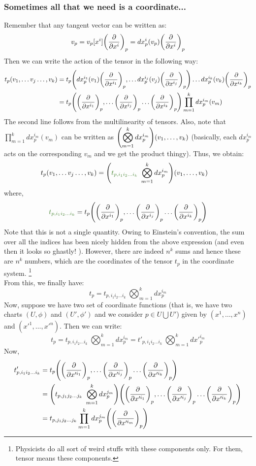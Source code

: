 \subsubsection{Sometimes all that we need is a coordinate...}
Remember that any tangent vector can be written as:
$$v_p = v_p[x^i]\qty(\pdv{x^i})_p = dx_p^i(v_p)\qty(\pdv{x^i})_p$$
Then we can write the action of the tensor in the following way:
\begin{align*}
    t_p\qty(v_1,\ldots v_j \ldots ,v_k) &= t_p\qty( dx^{i_1}_p(v_1)\qty(\pdv{x^{i_1}})_p, \ldots dx^{i_j}_p(v_j)\qty(\pdv{x^{i_j}})_p)\ldots dx^{i_k}_p(v_k)\qty(\pdv{x^{i_k}})_p\\
    &=t_p\qty(\qty(\pdv{x^{i_1}})_p, \ldots \qty(\pdv{x^{i_j}})_p \ldots \qty(\pdv{x^{i_k}})_p) \prod\limits_{m=1}^k dx^{i_m}_p(v_m)
\end{align*}
The second line follows from the multilinearity of tensors. Also, note that $\prod\limits_{m=1}^k dx^{i_m}_p(v_m)$ can be written as $ \displaystyle \qty(\bigotimes_{m=1}^k dx^{i_m}_p)(v_1,\ldots,v_k)$ (basically, each $dx^{i_m}_p$ acts on the corresponding $v_m$ and we get the product thingy). Thus, we obtain:
\begin{align*}
    t_p\qty(v_1,\ldots v_j \ldots ,v_k) &= \qty(\mathcolor{OliveGreen}{t_{p,i_1i_2\ldots i_k}}\ \bigotimes_{m=1}^k dx^{i_m}_p)(v_1,\ldots,v_k)
\end{align*}
where, $$\mathcolor{OliveGreen}{t_{p,i_1i_2\ldots i_k}} = t_p\qty(\qty(\pdv{x^{i_1}})_p, \ldots \qty(\pdv{x^{i_j}})_p \ldots \qty(\pdv{x^{i_k}})_p)$$ Note that this is not a single quantity. Owing to Einstein's convention, the sum over all the indices has been nicely hidden from the above expression (and even then it looks so ghastly! ). However, there are indeed $n^k$ sums and hence these are $n^k$ numbers, which are the coordinates of the tensor $t_p$ in the coordinate system. \footnote{Physicists do all sort of weird stuffs with these components only. For them, tensor means these components.}\\[0.2cm]
From this, we finally have:
$$t_p = t_{p,i_1i_2\ldots i_k} \ \bigotimes_{m=1}^k dx^{i_m}_p$$
Now, suppose we have two set of coordinate functions (that is, we have two charts $(U,\phi)$ and $(U',\phi')$ and we consider $p\in U\bigcup U'$) given by $(x^1,\ldots, x^n)$ and $(x'^1,\ldots, x'^n)$. Then we can write:
$$t_p = t_{p,i_1i_2\ldots i_k} \ \bigotimes_{m=1}^k dx^{i_m}_p = t'_{p,i_1i_2\ldots i_k} \ \bigotimes_{m=1}^k dx'^{i_m}_p$$
Now, 
\begin{align*}
     t'_{p,i_1i_2\ldots i_k} &=  t_p\qty(\qty(\pdv{x'^{i_1}})_p, \ldots \qty(\pdv{x'^{i_j}})_p \ldots \qty(\pdv{x'^{i_k}})_p)\\
&=\qty(t_{p,j_1j_2\ldots j_k} \ \bigotimes_{m=1}^k dx^{j_m}_p)\qty(\qty(\pdv{x'^{i_1}})_p, \ldots \qty(\pdv{x'^{i_j}})_p \ldots \qty(\pdv{x'^{i_k}})_p)\\
&=t_{p,j_1j_2\ldots j_k} \prod\limits_{m=1}^k dx_p^{j_m}\qty(\qty(\pdv{x'^{i_{m}}})_p)
\end{align*}
